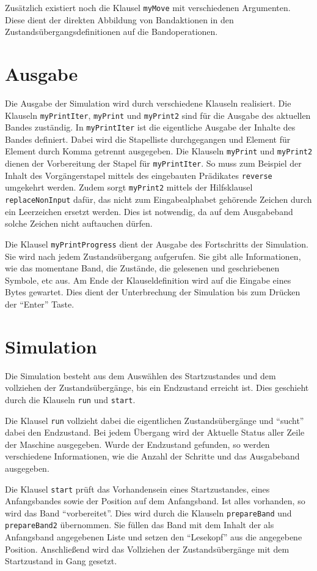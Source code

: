 \documentclass[final,a4paper,11pt,notitlepage,halfparskip]{scrreprt}
\begin{document}
Zusätzlich existiert noch die Klausel \texttt{myMove} mit verschiedenen
Argumenten. Diese dient der direkten Abbildung von Bandaktionen in den
Zustandsübergangsdefinitionen auf die Bandoperationen.

\section{Ausgabe}
Die Ausgabe der Simulation wird durch verschiedene Klauseln realisiert.
Die Klauseln \texttt{myPrintIter}, \texttt{myPrint} und
\texttt{myPrint2} sind für die Ausgabe des aktuellen Bandes zuständig.
In \texttt{myPrintIter} ist die eigentliche Ausgabe der Inhalte des
Bandes definiert. Dabei wird die Stapelliste durchgegangen und Element
für Element durch Komma getrennt ausgegeben. Die Klauseln
\texttt{myPrint} und \texttt{myPrint2} dienen der Vorbereitung der
Stapel für \texttt{myPrintIter}. So muss zum Beispiel der Inhalt des
Vorgängerstapel mittels des eingebauten Prädikates \texttt{reverse}
umgekehrt werden. Zudem sorgt \texttt{myPrint2} mittels der Hilfsklausel
\texttt{replaceNonInput} dafür, das nicht zum Eingabealphabet gehörende
Zeichen durch ein Leerzeichen ersetzt werden. Dies ist notwendig, da auf
dem Ausgabeband solche Zeichen nicht auftauchen dürfen.

Die Klausel \texttt{myPrintProgress} dient der Ausgabe des Fortschritts
der Simulation. Sie wird nach jedem Zustandsübergang aufgerufen. Sie
gibt alle Informationen, wie das momentane Band, die Zustände, die
gelesenen und geschriebenen Symbole, etc aus. Am Ende der
Klauseldefinition wird auf die Eingabe eines Bytes gewartet. Dies dient
der Unterbrechung der Simulation bis zum Drücken der "`Enter"' Taste.

\section{Simulation}
Die Simulation besteht aus dem Auswählen des Startzustandes und dem
vollziehen der Zustandsübergänge, bis ein Endzustand erreicht ist. Dies
geschieht durch die Klauseln \texttt{run} und \texttt{start}. 

Die Klausel \texttt{run} vollzieht dabei die eigentlichen Zustandsübergänge
und "`sucht"' dabei den Endzustand. Bei jedem Übergang wird der Aktuelle
Status aller Zeile der Maschine ausgegeben. Wurde der Endzustand
gefunden, so werden verschiedene Informationen, wie die Anzahl der
Schritte und das Ausgabeband ausgegeben.

Die Klausel \texttt{start} prüft das Vorhandensein eines Startzustandes,
eines Anfangsbandes sowie der Position auf dem Anfangsband. Ist alles
vorhanden, so wird das Band "`vorbereitet"'. Dies wird durch die Klauseln
\texttt{prepareBand} und \texttt{prepareBand2} übernommen. Sie füllen
das Band mit dem Inhalt der als Anfangsband angegebenen Liste und setzen
den "`Lesekopf"' aus die angegebene Position. Anschließend wird das
Vollziehen der Zustandsübergänge mit dem Startzustand in Gang gesetzt.
\end{document}

